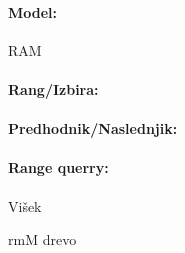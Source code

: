 
\paragraph{Model:}

RAM

\paragraph{Rang/Izbira:}

\paragraph{Predhodnik/Naslednjik:}

\paragraph{Range querry:}

Višek

rmM drevo